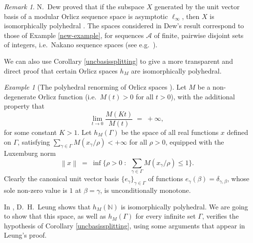 \documentclass[12pt,a4paper]{amsart}
\theoremstyle{definition}
\theoremstyle{remark}
\newtheorem{example}[theorem]{Example}
\newtheorem{remark}[theorem]{Remark}
\newcommand{\n}[1]{\ensuremath{\left\|{#1}\right\|}}
\newcommand{\N}{\mathbb{N}}
\newcommand{\ndot}{\ensuremath{\left\|\cdot\right\|}}
\newcommand{\set}[2]{\{{#1} \;:\;\, {#2}\}}
\begin{document}
\begin{remark}
N.\ Dew proved that if the subspace $X$ generated by the unit vector
basis of a modular Orlicz sequence space is asymptotic $\ell_\infty$,
then $X$ is isomorphically polyhedral \cite[Theorem 4.8.2]{dew}. The
spaces considered in Dew's result correspond to those of Example
\ref{new-example}, for sequences $\mathcal{A}$ of finite, pairwise
disjoint sets of integers, i.e.\ Nakano sequence spaces (see e.g.\
\cite{PR}).
\end{remark}

We can also use Corollary \ref{uncbasissplitting} to give a more
transparent and direct proof that certain Orlicz spaces $h_M$ are
isomorphically polyhedral.

\begin{example}[The polyhedral renorming of Orlicz spaces \cite{leung}]
Let $M$ be  a non-degenerate Orlicz function (i.e.\ $M(t)>0$ for all $t>0$),
with the additional property that
\begin{equation}\label{eq:hyp-leung}
\lim_{t\to 0} \frac{M(Kt)}{M(t)}\;=\;+\infty,
\end{equation}
for some constant $K>1$.  Let $h_M(\Gamma)$ be the space of all real
functions $x$ defined on $\Gamma$, satisfying $\sum_{\gamma\in \Gamma} M(x_{\gamma} /\rho)
<+\infty$ for all $\rho>0$, %
equipped with the Luxemburg norm
\[
\n{x} \;=\; \inf\set{\rho>0}{\sum_{\gamma\in \Gamma} M(x_{\gamma} /\rho) \leq 1}.
\]
Clearly the canonical unit vector basis $\{e_{\gamma}\}_{\gamma\in
\Gamma}$ of functions $e_{\gamma}(\beta)=\delta_{\gamma,\beta}$,
whose sole non-zero value is $1$ at $\beta=\gamma$, is
unconditionally monotone.

In \cite[Theorem 4]{leung}, D.\ H.\ Leung shows that $h_M(\N)$ is
isomorphically polyhedral. We are going to show that this space, as
well as $h_M(\Gamma)$ for every infinite set $\Gamma$, verifies the
hypothesis of Corollary \ref{uncbasissplitting}, using some
arguments that appear in Leung's proof.
\end{example}
\end{document}
